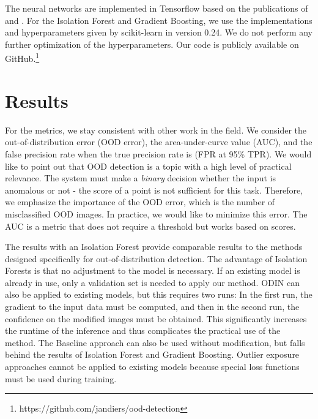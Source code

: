 \documentclass{article}
\begin{document}
The neural networks are implemented in Tensorflow based on the publications of \cite{Chen.21.03.2020} and \cite{Liang.2017}. For the Isolation Forest and Gradient Boosting, we use the implementations and hyperparameters given by scikit-learn \cite{FabianPedregosa.2011} in version 0.24. We do not perform any further optimization of the hyperparameters. Our code is publicly available on GitHub.\footnote{https://github.com/jandiers/ood-detection} 



\section{Results}

For the metrics, we stay consistent with other work in the field. We consider the out-of-distribution error (OOD error), the area-under-curve value (AUC), and the false precision rate when the true precision rate is  (FPR at 95\% TPR). We would like to point out that OOD detection is a topic with a high level of practical relevance. The system must make a \textit{binary} decision whether the input is anomalous or not - the score of a point is not sufficient for this task. Therefore, we emphasize the importance of the OOD error, which is the number of misclassified OOD images. In practice, we would like to minimize this error. The AUC is a metric that does not require a threshold but works based on scores.

The results with an Isolation Forest provide comparable results to the methods designed specifically for out-of-distribution detection. The advantage of Isolation Forests is that no adjustment to the model is necessary. If an existing model is already in use, only a validation set is needed to apply our method. ODIN can also be applied to existing models, but this requires two runs: In the first run, the gradient to the input data must be computed, and then in the second run, the confidence on the modified images must be obtained. This significantly increases the runtime of the inference and thus complicates the practical use of the method. The Baseline approach can also be used without modification, but falls behind the results of Isolation Forest and Gradient Boosting. Outlier exposure approaches cannot be applied to existing models because special loss functions must be used during training.
\end{document}
